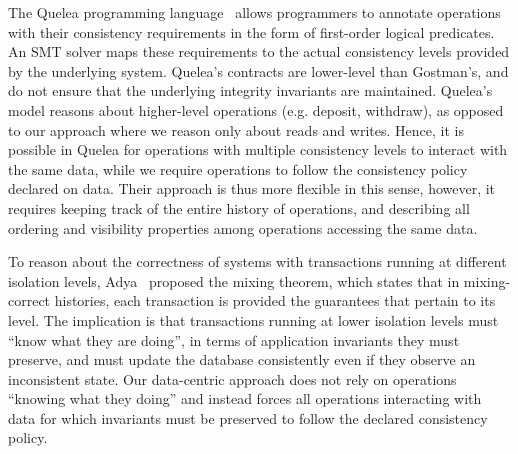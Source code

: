 \documentclass[numbers]{sigplanconf}
\begin{document}
The Quelea programming language~\cite{sivaramakrishnan2015declarative} allows
programmers to annotate operations with their consistency requirements
in the form of first-order logical predicates.
An SMT solver maps these requirements to the actual
consistency levels provided by the underlying system. Quelea's contracts are
lower-level than Gostman's, and do not ensure that the underlying integrity
invariants are maintained. Quelea's model reasons about higher-level
operations (e.g. deposit, withdraw), as opposed to our approach where we reason 
only about reads and writes. Hence, it is possible in Quelea for operations with
multiple consistency levels to interact with the same data, while we require 
operations to follow the consistency policy declared on data. Their 
approach is thus more flexible in this sense, however, it requires keeping track of the entire
history of operations, and describing all ordering and visibility properties among 
operations accessing the same data.

To reason about the correctness of systems with transactions running at different
isolation levels, Adya~\cite{adya2000generalized} proposed the mixing
theorem, which states that in mixing-correct histories, each transaction is provided 
the guarantees that pertain to its level. The implication is that transactions running 
at lower isolation levels must ``know what they are doing'', in terms of application 
invariants they must preserve, and must update the database consistently even if they observe an
inconsistent state. Our data-centric approach does not rely on operations
``knowing what they doing'' and instead forces all operations interacting with data
for which invariants must be preserved to follow the declared consistency
policy. 
\end{document}
